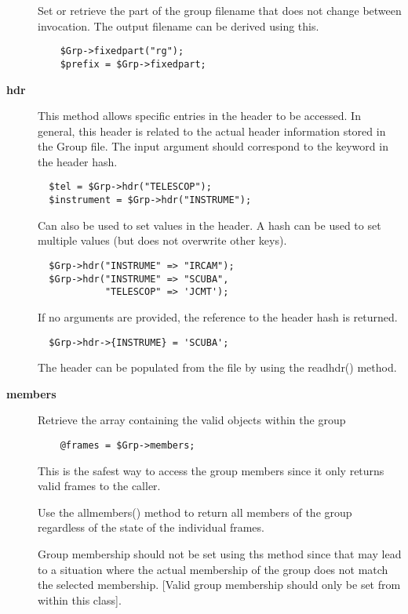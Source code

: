 \begin{description}
Set or retrieve the part of the group filename that does not
change between invocation. The output filename can be derived using
this.

\begin{verbatim}
    $Grp->fixedpart("rg");
    $prefix = $Grp->fixedpart;
\end{verbatim}
\item[\textbf{hdr}] \mbox{}

This method allows specific entries in the header to be accessed.  In
general, this header is related to the actual header information
stored in the Group file. The input argument should correspond to the
keyword in the header hash.

\begin{verbatim}
  $tel = $Grp->hdr("TELESCOP");
  $instrument = $Grp->hdr("INSTRUME");
\end{verbatim}


Can also be used to set values in the header.
A hash can be used to set multiple values (but does not overwrite
other keys).

\begin{verbatim}
  $Grp->hdr("INSTRUME" => "IRCAM");
  $Grp->hdr("INSTRUME" => "SCUBA", 
            "TELESCOP" => 'JCMT');
\end{verbatim}


If no arguments are provided, the reference to the header hash
is returned.

\begin{verbatim}
  $Grp->hdr->{INSTRUME} = 'SCUBA';
\end{verbatim}


The header can be populated from the file by using the readhdr()
method.

\item[\textbf{members}] \mbox{}

Retrieve the array containing the valid objects within the group

\begin{verbatim}
    @frames = $Grp->members;
\end{verbatim}


This is the safest way to access the group members
since it only returns valid frames to the caller.



Use the allmembers() method to return all members of the group 
regardless of the state of the individual frames.



Group membership should not be set using ths method since that may lead
to a situation where the actual membership of the group does not match the
selected membership. [Valid group membership should only be set from
within this class].




\end{description}
